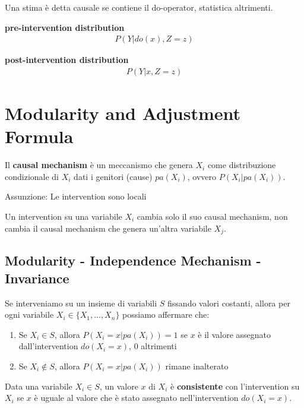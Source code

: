 Una stima è detta causale se contiene il do-operator, statistica altrimenti.

\bigskip
\begin{center}
  \begin{minipage}{0.475\linewidth}
    \centering
    \textbf{pre-intervention distribution}
    \begin{align*}
      P(Y | do(x), Z = z)
    \end{align*}
  \end{minipage}
  \begin{minipage}{0.475\linewidth}
    \centering
    \textbf{post-intervention distribution}
    \begin{align*}
      P(Y | x, Z = z)
    \end{align*}
  \end{minipage}
\end{center}
\bigskip

\section{Modularity and Adjustment Formula}
Il \textbf{causal mechanism} è un meccanismo che genera $X_i$ come distribuzione condizionale di $X_i$ dati i genitori (cause) $pa(X_i)$, ovvero $P(X_i | pa(X_i))$.

Assunzione: Le intervention sono locali

Un intervention su una variabile $X_i$ cambia solo il suo causal mechanism, non cambia il causal mechanism che genera un'altra variabile $X_j$.

\subsection*{Modularity - Independence Mechanism - Invariance}
Se interveniamo su un insieme di variabili $S$ fissando valori costanti,
allora per ogni variabile $X_i \in \{X_1, ..., X_n\}$ possiamo affermare che:
\begin{enumerate}
  \item Se $X_i \in S$, allora $P(X_i = x| pa(X_i)) = 1$ se $x$ è il valore assegnato dall'intervention $do(X_i=x)$, 0 altrimenti
  \item Se $X_i \not\in S$, allora $P(X_i = x | pa(X_i))$ rimane inalterato
\end{enumerate}

Data una variabile $X_i \in S$, un valore $x$ di $X_i$ è \textbf{consistente} con l'intervention su $X_i$ se $x$ è uguale al valore che è stato assegnato nell'intervention $do(X_i=x)$.

